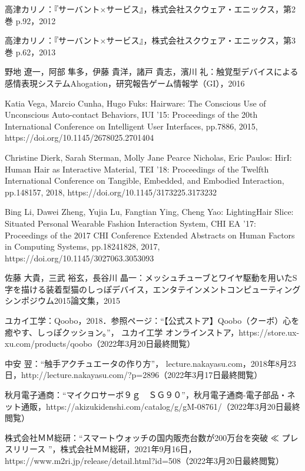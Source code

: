 \documentclass[a4paper]{jsarticle}
\begin{document}
\begin{thebibliography}{999}
高津カリノ：『サーバント×サービス』，株式会社スクウェア・エニックス，第2巻 p.92，2012

高津カリノ：『サーバント×サービス』，株式会社スクウェア・エニックス，第3巻 p.62，2013

野地 遼一，阿部 隼多，伊藤 貴洋，諸戸 貴志，濱川 礼：触覚型デバイスによる感情表現システムAhogation，研究報告ゲーム情報学（GI），2016

\begin{flushleft}
Katia Vega, Marcio Cunha, Hugo Fuks: Hairware: The Conscious Use of Unconscious Auto-contact Behaviors, IUI '15: Proceedings of the 20th International Conference on Intelligent User Interfaces, pp.7886, 2015, https://doi.org/10.1145/2678025.2701404
\end{flushleft}

Christine Dierk, Sarah Sterman, Molly Jane Pearce Nicholas, Eric Paulos: HirI: Human Hair as Interactive Material, TEI '18: Proceedings of the Twelfth International Conference on Tangible, Embedded, and Embodied Interaction, pp.148157, 2018, https://doi.org/10.1145/3173225.3173232

Bing Li, Dawei Zheng, Yujia Lu, Fangtian Ying, Cheng Yao: LightingHair Slice: Situated Personal Wearable Fashion Interaction System, CHI EA '17: Proceedings of the 2017 CHI Conference Extended Abstracts on Human Factors in Computing Systems, pp.18241828, 2017, https://doi.org/10.1145/3027063.3053093

佐藤 大貴，三武 裕玄，長谷川 晶一：メッシュチューブとワイヤ駆動を用いたS字を描ける装着型猫のしっぽデバイス，エンタテインメントコンピューティングシンポジウム2015論文集，2015

ユカイ工学：Qoobo，2018．参照ページ：“【公式ストア】Qoobo（クーボ）心を癒やす、しっぽクッション。”， ユカイ工学 オンラインストア，https://store.ux-xu.com/products/qoobo（2022年3月20日最終閲覧）

中安 翌：“触手アクチュエータの作り方”， lecture.nakayasu.com，2018年8月23日，http://lecture.nakayasu.com/?p=2896（2022年3月17日最終閲覧）

秋月電子通商：“マイクロサーボ９ｇ　ＳＧ９０”，秋月電子通商-電子部品・ネット通販，https://akizukidenshi.com/catalog/g/gM-08761/（2022年3月20日最終閲覧）

\begin{flushleft}
株式会社ＭＭ総研：“スマートウォッチの国内販売台数が200万台を突破 ≪ プレスリリース ”，株式会社ＭＭ総研，2021年9月16日，https://www.m2ri.jp/release/detail.html?id=508（2022年3月20日最終閲覧）
\end{flushleft}


\end{thebibliography}
\end{document}
